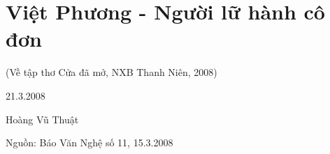 \documentclass[../main.tex]{subfiles}
\begin{document}
\chapter{Việt Phương - Người lữ hành cô đơn}

\begin{subtitle}

(Về tập thơ Cửa đã mở, NXB Thanh Niên, 2008)

\end{subtitle}

\begin{metadata}

\begin{flushright}21.3.2008\end{flushright}

Hoàng Vũ Thuật

Nguồn: Báo Văn Nghệ số 11, 15.3.2008

\end{metadata}
\end{document}
